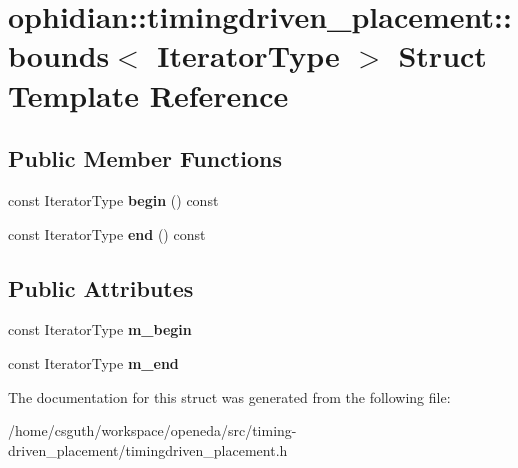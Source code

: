 \hypertarget{structophidian_1_1timingdriven__placement_1_1bounds}{\section{ophidian\-:\-:timingdriven\-\_\-placement\-:\-:bounds$<$ Iterator\-Type $>$ Struct Template Reference}
\label{structophidian_1_1timingdriven__placement_1_1bounds}
}
\subsection*{Public Member Functions}
\begin{DoxyCompactItemize}
\item 
\hypertarget{structophidian_1_1timingdriven__placement_1_1bounds_a4a5dec86d092385ce3a843bfbfa07718}{const Iterator\-Type {\bfseries begin} () const }\label{structophidian_1_1timingdriven__placement_1_1bounds_a4a5dec86d092385ce3a843bfbfa07718}

\item 
\hypertarget{structophidian_1_1timingdriven__placement_1_1bounds_afc8753e4841c1623ba8158f4e7cd2373}{const Iterator\-Type {\bfseries end} () const }\label{structophidian_1_1timingdriven__placement_1_1bounds_afc8753e4841c1623ba8158f4e7cd2373}

\end{DoxyCompactItemize}
\subsection*{Public Attributes}
\begin{DoxyCompactItemize}
\item 
\hypertarget{structophidian_1_1timingdriven__placement_1_1bounds_a3c464662616b5e72c35a38399c8f6a2a}{const Iterator\-Type {\bfseries m\-\_\-begin}}\label{structophidian_1_1timingdriven__placement_1_1bounds_a3c464662616b5e72c35a38399c8f6a2a}

\item 
\hypertarget{structophidian_1_1timingdriven__placement_1_1bounds_a12411fb601a14e937bd986708f74a229}{const Iterator\-Type {\bfseries m\-\_\-end}}\label{structophidian_1_1timingdriven__placement_1_1bounds_a12411fb601a14e937bd986708f74a229}

\end{DoxyCompactItemize}


The documentation for this struct was generated from the following file\-:\begin{DoxyCompactItemize}
\item 
/home/csguth/workspace/openeda/src/timing-\/driven\-\_\-placement/timingdriven\-\_\-placement.\-h\end{DoxyCompactItemize}

